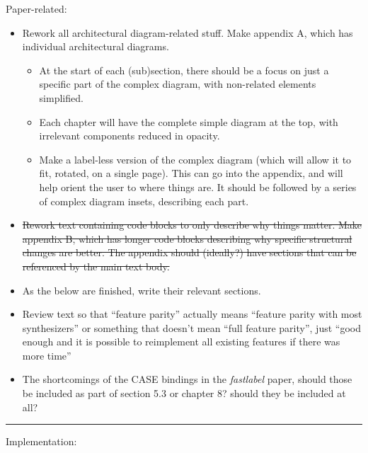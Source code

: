 Paper-related:

\begin{itemize}
\tightlist
\item
  Rework all architectural diagram-related stuff. Make appendix A, which
  has individual architectural diagrams.

  \begin{itemize}
  \tightlist
  \item
    At the start of each (sub)section, there should be a focus on just a
    specific part of the complex diagram, with non-related elements
    simplified.
  \item
    Each chapter will have the complete simple diagram at the top, with
    irrelevant components reduced in opacity.
  \item
    Make a label-less version of the complex diagram (which will allow
    it to fit, rotated, on a single page). This can go into the
    appendix, and will help orient the user to where things are. It
    should be followed by a series of complex diagram insets, describing
    each part.
  \end{itemize}
\item
  \st{Rework text containing code blocks to only describe why things
  matter. Make appendix B, which has longer code blocks describing why
  specific structural changes are better. The appendix should (ideally?)
  have sections that can be referenced by the main text body.}
\item
  As the below are finished, write their relevant sections.
\item
  Review text so that ``feature parity'' actually means ``feature parity
  with most synthesizers'' or something that doesn't mean ``full feature
  parity'', just ``good enough and it is possible to reimplement all
  existing features if there was more time''
\item
  The shortcomings of the CASE bindings in the \emph{fastlabel} paper,
  should those be included as part of section 5.3 or chapter 8? should
  they be included at all?
\end{itemize}

\begin{center}\rule{0.5\linewidth}{0.5pt}\end{center}

Implementation:


